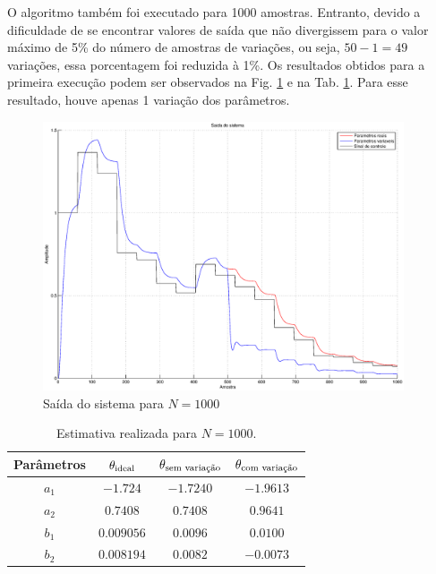 O algoritmo também foi executado para 1000 amostras. Entranto, devido a
dificuldade de se encontrar valores de saída que não divergissem para o valor
máximo de 5\% do número de amostras de variações, ou seja, $50 - 1 = 49$
variações, essa porcentagem foi reduzida à 1\%. Os resultados obtidos para a
primeira execução podem ser observados na Fig. \ref{fig:saida_sist_1000} e na
Tab. \ref{tab:estimativa_1000}. Para esse resultado, houve apenas 1 variação dos
parâmetros.

\begin{figure}[htb]
\centering
    \includegraphics[width=0.95\textwidth]{imgs/questao2/saida_1000}
    \caption{Saída do sistema para $N = 1000$}
    \label{fig:saida_sist_1000}
\end{figure}

\begin{table}
\centering
    \caption{Estimativa realizada para $N = 1000$.}
    \label{tab:estimativa_1000}
    \vspace{0.25cm}
    \begin{tabular}{|c|c|c|c|}
        \hline
        Parâmetros & 
        $\mathbf{\theta}_{\text{ideal}}$&
        $\mathbf{\theta}_{\text{sem variação}}$&
        $\mathbf{\theta}_{\text{com variação}}$\\
        \hline
        \hline
        $a_1$ & $-1.724$   & $-1.7240$ & $-1.9613$ \\
        \hline
        $a_2$ & $0.7408$   & $0.7408$  & $0.9641$ \\
        \hline
        $b_1$ & $0.009056$ & $0.0096$  & $0.0100$ \\
        \hline
        $b_2$ & $0.008194$ & $0.0082$  & $-0.0073$ \\
        \hline
    \end{tabular}
\end{table}

